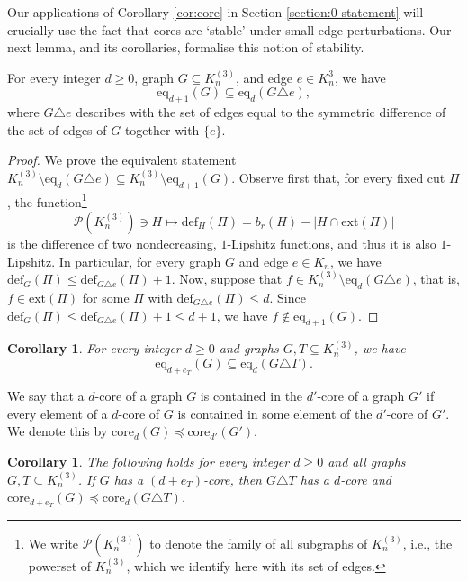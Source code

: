 \documentclass[11pt,a4paper,oneside,reqno]{amsart}
\newtheorem{cor}[thm]{Corollary}
\newcommand{\cP}{\mathcal{P}}
\newcommand{\1}{\mathbbm{1}} %
\renewcommand{\le}{\leqslant}
\renewcommand{\ge}{\geqslant}
\newcommand{\deficit}{\mathrm{def}}
\newcommand{\ext}{\mathrm{ext}}
\newcommand{\core}{\mathrm{core}}
\newcommand{\eq}{\mathrm{eq}}
\begin{document}
Our applications of Corollary \ref{cor:core} in Section \ref{section:0-statement} will crucially use the fact that cores are `stable' under small edge perturbations.  Our next lemma, and its corollaries, formalise this notion of stability.

\begin{lemma}
  \label{lemma:eq-d-nested}
  For every integer $d \ge 0$, graph $G \subseteq K_n^{(3)}$, and edge $e \in K_n^{3}$, we have
  \[
    \eq_{d+1} (G) \subseteq \eq_d(G \triangle e),
  \]
  where $G \triangle e$ describes with the set of edges equal to the symmetric difference of the set of edges of $G$ together with $\{e\}$.
\end{lemma}
\begin{proof}
  We prove the equivalent statement $K_n^{(3)} \setminus \eq_d(G \triangle e) \subseteq K_n^{(3)} \setminus \eq_{d+1}(G)$.
  Observe first that, for every fixed cut $\Pi$, the function\footnote{We write $\cP(K_n^{(3)})$ to denote the family of all subgraphs of $K_n^{(3)}$, i.e., the powerset of $K_n^{(3)}$, which we identify here with its set of edges.}
  \[
    \cP(K_n^{(3)}) \ni H \mapsto \deficit_H(\Pi) = b_r(H) - \big|H \cap \ext(\Pi)\big|
  \]
  is the difference of two nondecreasing, $1$-Lipshitz functions, and thus it is also $1$-Lipshitz.
  In particular, for every graph $G$ and edge $e \in K_n$, we have $\deficit_G(\Pi) \le \deficit_{G \triangle e}(\Pi) + 1$.
  Now, suppose that $f \in K_n^{(3)} \setminus \eq_d(G \triangle e)$, that is, $f \in \ext(\Pi)$ for some $\Pi$ with $\deficit_{G \triangle e}(\Pi) \le d$.  Since $\deficit_G(\Pi) \le \deficit_{G \triangle e}(\Pi) + 1 \le d+1$, we have $f \notin \eq_{d+1}(G)$.
\end{proof}

\begin{cor}
  \label{cor:eq-d-nested}
  For every integer $d \ge 0$ and graphs $G, T \subseteq K_n^{(3)}$, we have
  \[
    \eq_{d+e_T} (G) \subseteq \eq_d(G \triangle T).
  \]
\end{cor}

We say that a $d$-core of a graph $G$ is contained in the $d'$-core of a graph $G'$ if every element of a $d$-core of $G$ is contained in some element of the $d'$-core of $G'$. We denote this by $\core_{d}(G) \preceq \core_{d'}(G')$.
\begin{cor}
  \label{cor:core-d-nested}
  The following holds for every integer $d \ge 0$ and all graphs $G, T \subseteq K_n^{(3)}$.
  If $G$ has a $(d+e_T)$-core, then $G \triangle T$ has a $d$-core and $\core_{d+e_T}(G) \preceq \core_d(G \triangle T)$.
\end{cor}
\end{document}

